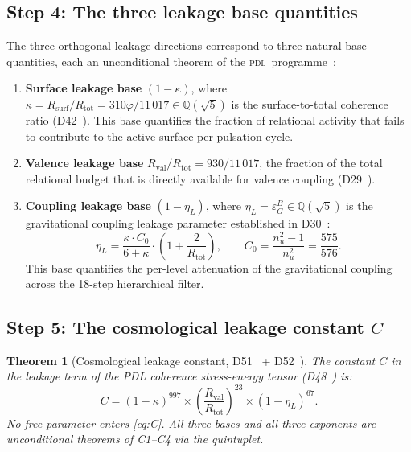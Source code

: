 \documentclass[12pt,a4paper]{article}
\theoremstyle{plain}
\newtheorem{theorem}{Theorem}[section]
\theoremstyle{definition}
\theoremstyle{remark}
\newcommand{\PDL}{\textsc{pdl}}
\newcommand{\Rsurf}{R_{\mathrm{surf}}}
\newcommand{\Rtot}{R_{\mathrm{tot}}}
\newcommand{\Rval}{R_{\mathrm{val}}}
\newcommand{\kap}{\kappa}
\newcommand{\etaL}{\eta_L}
\newcommand{\vp}{\varphi}
\begin{document}
\subsection{Step 4: The three leakage base quantities}
\label{subsec:bases}

The three orthogonal leakage directions correspond to three natural base quantities, each an unconditional theorem of the \PDL\ programme~\cite{PDL_D52_2026}:

\begin{enumerate}
\item \textbf{Surface leakage base} $(1 - \kap)$, where $\kap = \Rsurf/\Rtot = 310\vp/11\,017 \in \mathbb{Q}(\sqrt{5})$ is the surface-to-total coherence ratio (D42~\cite{PDL_D42_2026}). This base quantifies the fraction of relational activity that fails to contribute to the active surface per pulsation cycle.
\item \textbf{Valence leakage base} $\Rval/\Rtot = 930/11\,017$, the fraction of the total relational budget that is directly available for valence coupling (D29~\cite{PDL_D29_2026}).
\item \textbf{Coupling leakage base} $(1 - \etaL)$, where $\etaL = \varepsilon_G^B \in \mathbb{Q}(\sqrt{5})$ is the gravitational coupling leakage parameter established in D30~\cite{PDL_D30_2026}:
\begin{equation}
\etaL = \frac{\kap \cdot C_0}{6 + \kap} \cdot \left(1 + \frac{2}{\Rtot}\right), \qquad C_0 = \frac{n_u^2 - 1}{n_u^2} = \frac{575}{576}.
\label{eq:etaL}
\end{equation}
This base quantifies the per-level attenuation of the gravitational coupling across the 18-step hierarchical filter.
\end{enumerate}

\subsection{Step 5: The cosmological leakage constant \texorpdfstring{$C$}{C}}
\label{subsec:C}

\begin{theorem}[Cosmological leakage constant, D51~\cite{PDL_D51_2026} + D52~\cite{PDL_D52_2026}]
\label{thm:C}
The constant $C$ in the leakage term of the PDL coherence stress-energy tensor (D48~\cite{PDL_D48_2026}) is:
\begin{equation}
\boxed{C = (1-\kap)^{997} \times \left(\frac{\Rval}{\Rtot}\right)^{23} \times (1-\etaL)^{67}.}
\label{eq:C}
\end{equation}
No free parameter enters \eqref{eq:C}. All three bases and all three exponents are unconditional theorems of C1--C4 via the quintuplet.
\end{theorem}
\end{document}
